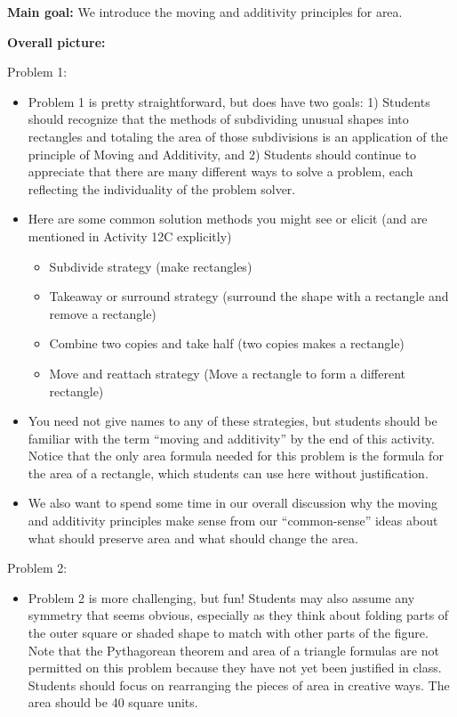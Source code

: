 \documentclass[noauthor,nooutcomes]{ximera}
\begin{document}
\newpage




\begin{instructorNotes}
{\bf Main goal:} We introduce the moving and additivity principles for area.

{\bf Overall picture:} 

Problem 1:
\begin{itemize}
\item Problem 1 is pretty straightforward, but does have two goals: 1) Students should recognize that the methods of subdividing unusual shapes into rectangles and totaling the area of those subdivisions is an application of the principle of Moving and Additivity, and 2) Students should continue to appreciate that there are many different ways to solve a problem, each reflecting the individuality of the problem solver.

\item Here are some common solution methods you might see or elicit (and are mentioned in Activity 12C explicitly)
\begin{itemize}
    \item Subdivide strategy (make rectangles)
    \item Takeaway or surround strategy (surround the shape with a rectangle and remove a rectangle)
    \item Combine two copies and take half (two copies makes a rectangle)
    \item Move and reattach strategy (Move a rectangle to form a different rectangle)
\end{itemize}

\item You need not give names to any of these strategies, but students should be familiar with the term ``moving and additivity'' by the end of this activity.  Notice that the only area formula needed for this problem is the formula for the area of a rectangle, which students can use here without justification.
\item We also want to spend some time in our overall discussion why the moving and additivity principles make sense from our ``common-sense'' ideas about what should preserve area and what should change the area.
\end{itemize}

Problem 2:
\begin{itemize}
\item Problem 2 is more challenging, but fun!   Students may also assume any symmetry that seems obvious, especially as they think about folding parts of the outer square or shaded shape to match with other parts of the figure. Note that the Pythagorean theorem and area of a triangle formulas are not permitted on this problem because they have not yet been justified in class. Students should focus on rearranging the pieces of area in creative ways. The area should be 40 square units.
\end{itemize}



\end{instructorNotes}
\end{document}
